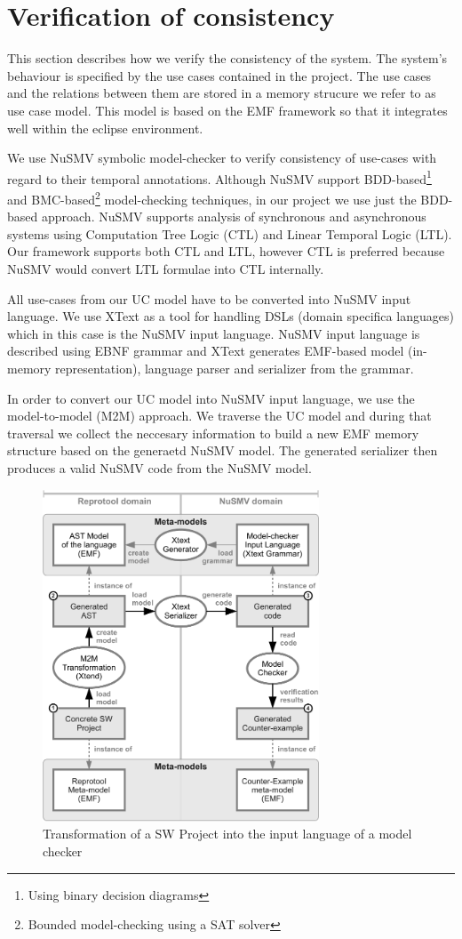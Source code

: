 \section{Verification of consistency}
This section describes how we verify the consistency of the system. The system's behaviour is specified by the use cases contained
in the project. The use cases and the relations between them are stored in a memory strucure we refer to as use case model.
This model is based on the EMF framework so that it integrates well within the eclipse environment.

We use NuSMV symbolic model-checker to verify consistency of use-cases with regard to their temporal annotations.
Although NuSMV support BDD-based\footnote{Using binary decision diagrams} and BMC-based\footnote{Bounded model-checking using a SAT solver} model-checking techniques, in our project we use just the BDD-based approach.
NuSMV supports analysis of synchronous and asynchronous systems using Computation Tree Logic (CTL) and Linear Temporal Logic (LTL).
Our framework supports both CTL and LTL, however CTL is preferred because NuSMV would convert LTL formulae into CTL internally.

All use-cases from our UC model have to be converted into NuSMV input language.
We use XText as a tool for handling DSLs (domain specifica languages) which in this case is the NuSMV input language.
NuSMV input language is described using EBNF grammar and XText generates EMF-based model (in-memory representation), language parser and serializer from the grammar.

In order to convert our UC model into NuSMV input language, we use the model-to-model (M2M) approach.
We traverse the UC model and during that traversal we collect the neccesary information to build a new EMF memory structure based on the generaetd NuSMV model.
The generated serializer then produces a valid NuSMV code from the NuSMV model.

\begin{figure}[ht]
  \centering
  \includegraphics[height=280pt]{images/XtextWorkflow}
  \caption{Transformation of a SW Project into the input language of a model checker}
  \label{fig:XtextWorkflow}
\end{figure}
\pagebreak

